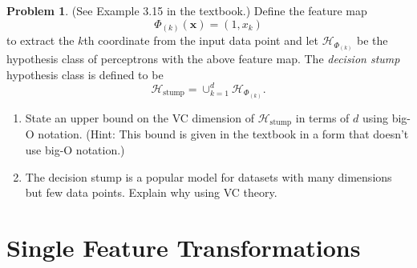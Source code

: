 \documentclass[10pt]{exam}
\theoremstyle{definition}
\newtheorem{problem}{Problem}
\newcommand{\x}{\mathbf x}
\newcommand{\HH}[1]{\mathcal H_{\text{#1}}}
\begin{document}
\newpage
\begin{problem}
    (See Example 3.15 in the textbook.)
    Define the feature map
    \begin{equation}
        \Phi_{(k)}(\x) = (1, x_k)
    \end{equation}
    to extract the $k$th coordinate from the input data point and let $\HH{$\Phi_{(k)}$}$ be the hypothesis class of perceptrons with the above feature map.
    The \emph{decision stump} hypothesis class is defined to be
    \begin{equation}
        \HH{stump} = \cup_{k=1}^d \HH{$\Phi_{(k)}$}.
    \end{equation}
    \begin{enumerate}
        \item
            State an upper bound on the VC dimension of $\HH{stump}$ in terms of $d$ using big-O notation.
            (Hint: This bound is given in the textbook in a form that doesn't use big-O notation.)
            \vspace{3in}
        \item
            The decision stump is a popular model for datasets with many dimensions but few data points.  Explain why using VC theory.
            \vspace{3in}
    \end{enumerate}
\end{problem}

\newpage
\section*{Single Feature Transformations}
\end{document}
